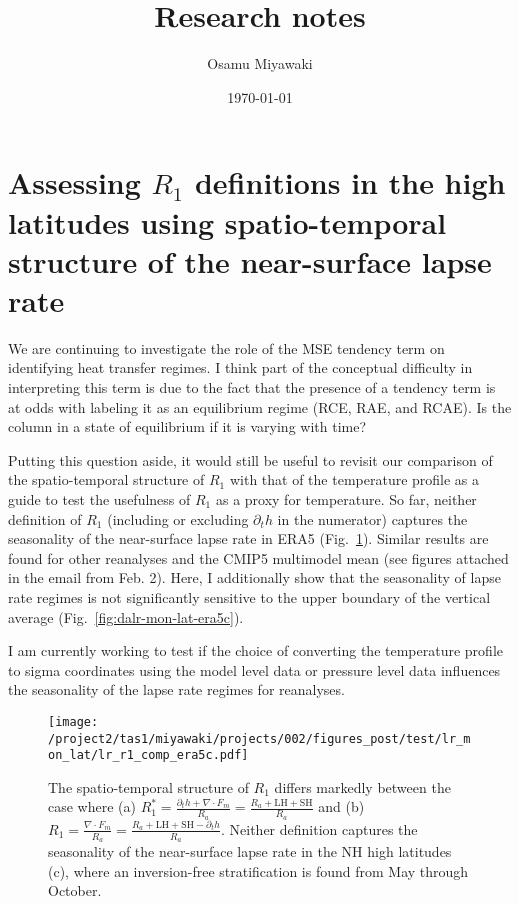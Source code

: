 \documentclass{article}
\title{Research notes}
\date{\today}
\author{Osamu Miyawaki}
\begin{document}
\maketitle

\section{Assessing $R_1$ definitions in the high latitudes using spatio-temporal structure of the near-surface lapse rate}

We are continuing to investigate the role of the MSE tendency term on identifying heat transfer regimes. I think part of the conceptual difficulty in interpreting this term is due to the fact that the presence of a tendency term is at odds with labeling it as an equilibrium regime (RCE, RAE, and RCAE). Is the column in a state of equilibrium if it is varying with time?

Putting this question aside, it would still be useful to revisit our comparison of the spatio-temporal structure of $R_1$ with that of the temperature profile as a guide to test the usefulness of $R_1$ as a proxy for temperature. So far, neither definition of $R_1$ (including or excluding $\partial_t h$ in the numerator) captures the seasonality of the near-surface lapse rate in ERA5 (Fig.~\ref{fig:lr-r1-era5c}). Similar results are found for other reanalyses and the CMIP5 multimodel mean (see figures attached in the email from Feb. 2). Here, I additionally show that the seasonality of lapse rate regimes is not significantly sensitive to the upper boundary of the vertical average (Fig.~\ref{fig:dalr-mon-lat-era5c}).

I am currently working to test if the choice of converting the temperature profile to sigma coordinates using the model level data or pressure level data influences the seasonality of the lapse rate regimes for reanalyses. 

\begin{figure}
    \texttt{[image: /project2/tas1/miyawaki/projects/002/figures\_post/test/lr\_mon\_lat/lr\_r1\_comp\_era5c.pdf]}
    \caption{The spatio-temporal structure of $R_1$ differs markedly between the case where (a) $R_1^*=\frac{\partial_t h+\nabla\cdot F_m}{R_a} = \frac{R_a+\mathrm{LH+SH}}{R_a}$ and (b) $R_1=\frac{\nabla\cdot F_m}{R_a} = \frac{R_a+\mathrm{LH+SH}-\partial_t h}{R_a}$. Neither definition captures the seasonality of the near-surface lapse rate in the NH high latitudes (c), where an inversion-free stratification is found from May through October.} 
    \label{fig:lr-r1-era5c}
\end{figure}
\end{document}
